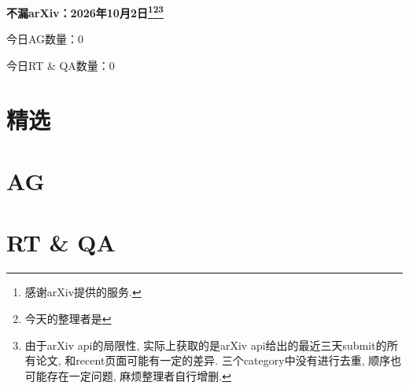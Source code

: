\documentclass[9pt, a4paper]{article}
\theoremstyle{plain}
\theoremstyle{definition}
\theoremstyle{remark}
\newcommand{\AGnumber}{0}
\newcommand{\RTQAnumber}{0}
\newcommand{\NewestDate}{2026年10月2日}
\newcommand{\todayarXiver}{} %
\begin{document}
\begin{center}
    \Huge\textbf{不漏arXiv：\NewestDate\footnote{感谢arXiv提供的服务.}\footnote{今天的整理者是\todayarXiver}\footnote{由于arXiv api的局限性, 实际上获取的是arXiv api给出的最近三天submit的所有论文, 和recent页面可能有一定的差异. 三个category中没有进行去重, 顺序也可能存在一定问题, 麻烦整理者自行增删.}} \\
\end{center}

\setcounter{section}{-1}

\begin{center}
    今日AG数量：\AGnumber
    
    今日RT \& QA数量：\RTQAnumber
    
\end{center}


\section{精选}


\section{AG}

\section{RT \& QA}
\end{document}
